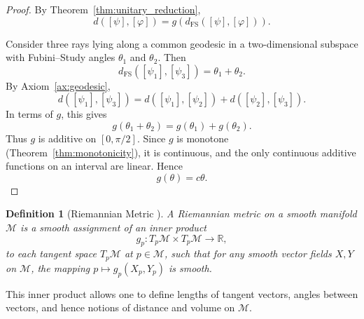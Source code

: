 \documentclass[aps,pra,reprint,nofootinbib,showpacs,superscriptaddress]{revtex4-1}
\newtheorem{definition}[theorem]{Definition}
\begin{document}
\begin{proof}
By Theorem~\ref{thm:unitary_reduction},
\[
d([\psi],[\varphi])
=
g(d_{\mathrm{FS}}([\psi],[\varphi])).
\]

Consider three rays lying along a common geodesic
in a two-dimensional subspace with
Fubini--Study angles $\theta_1$ and $\theta_2$.
Then
\[
d_{\mathrm{FS}}([\psi_1],[\psi_3])
=
\theta_1+\theta_2.
\]
By Axiom~\ref{ax:geodesic},
\[
d([\psi_1],[\psi_3])
=
d([\psi_1],[\psi_2])
+
d([\psi_2],[\psi_3]).
\]
In terms of $g$, this gives
\[
g(\theta_1+\theta_2)
=
g(\theta_1)+g(\theta_2).
\]
Thus $g$ is additive on $[0,\pi/2]$.
Since $g$ is monotone (Theorem~\ref{thm:monotonicity}),
it is continuous, and the only continuous additive
functions on an interval are linear.
Hence
\[
g(\theta)=c\theta.
\]
\end{proof}


\begin{definition}[Riemannian Metric \cite{lee2018introduction}]\label{def:rm}
A \emph{Riemannian metric} on a smooth manifold $\mathscr{M}$ is a smooth assignment of an inner product 
\[
g_p : T_p \mathscr{M} \times T_p \mathscr{M} \to \mathbb{R},
\]
to each tangent space $T_p \mathscr{M}$ at $p \in \mathscr{M}$, such that for any smooth vector fields $X,Y$ on $\mathscr{M}$, the mapping $p \mapsto g_p(X_p,Y_p)$ is smooth. 
\end{definition}
This inner product allows one to define lengths of tangent vectors, angles between vectors, and hence notions of distance and volume on $\mathscr{M}$.
\end{document}
